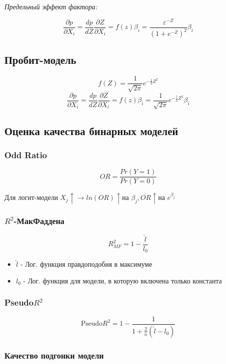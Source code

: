 \documentclass[a4paper, 12pt]{article}
\begin{document}
\begin{center}
    \textit{Предельный эффект фактора:}
\end{center}
\[\frac{\partial p}{\partial X_{i}} = \frac{dp}{dZ}\frac{\partial Z}{\partial X_{i}} = f(z)\beta_{i} = \frac{\varepsilon^{-Z}}{(1 + e^{-Z})^{2}}\beta_{i}\]

\subsection{Пробит-модель}

\[f(Z) = \frac{1}{\sqrt{2\pi}}e^{-\frac{1}{2}Z^{2}}\]
\[\frac{\partial p}{\partial X_{i}} = \frac{dp}{dZ}\frac{\partial Z}{\partial X_{i}} = f(z)\beta_{i} = \frac{1}{\sqrt{2\pi}}e^{-\frac{1}{2}Z^{2}}\beta_{i}\]

\subsection{Оценка качества бинарных моделей}

\subsubsection{Odd Ratio}
\[OR = \frac{Pr(Y = 1)}{Pr(Y = 0)}\]

Для логит-модели $X_{j} \uparrow \rightarrow ln(OR)\uparrow \textrm{на } \beta_{j}, OR\uparrow \textrm{на } e^{\beta_{j}}$
\newline

\subsubsection{$R^{2}$-МакФаддена}

\[R^{2}_{MF} = 1 - \frac{\hat{l}}{l_{0}}\]
\begin{itemize}
    \item $\hat{l}$ - Лог. функция правдоподобия в максимуме
    \item  $l_{0}$ - Лог. функция для модели, в которую включена только константа
\end{itemize}

\subsubsection{Pseudo$R^{2}$}

\[\textrm{Pseudo}R^{2} = 1 - \frac{1}{1 + \frac{2}{n}(\hat{l} - l_{0})}\]

\subsubsection{Качество подгонки модели}
\end{document}
